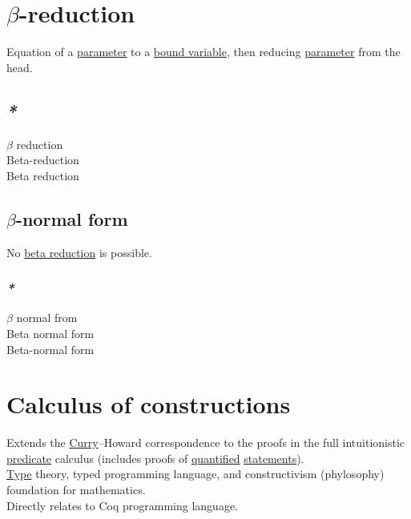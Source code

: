 \documentclass[a4paper,14pt,oneside]{book}
\begin{document}
\section{\label{org6d482ad}\(\beta\)-reduction}
\label{sec:org369f110}
Equation of a \hyperref[orgd362766]{parameter} to a \hyperref[org230eb36]{bound variable}, then reducing \hyperref[orgd362766]{parameter} from the head.\\

\subsection{\emph{*}}
\label{sec:orgc40643f}

\label{org1c571d6}\(\beta\) reduction\\
\label{org7a5a6e0}Beta-reduction\\
\label{org3043566}Beta reduction\\

\subsection{\label{org4f87f1e}\(\beta\)-normal form}
\label{sec:org98c0a7f}
No \hyperref[org3043566]{beta reduction} is possible.\\

\subsubsection{\emph{*}}
\label{sec:org215bb0d}

\label{org75d11a5}\(\beta\) normal from\\
\label{org8772320}Beta normal form\\
\label{orgc21b408}Beta-normal form\\

\section{\label{orgb0aaf3f}Calculus of constructions}
\label{sec:orgaec9a43}
Extends the \hyperref[orgea93031]{Curry}–Howard correspondence to the proofs in the full intuitionistic \hyperref[orgff4f831]{predicate} calculus (includes proofs of \hyperref[org1c9a919]{quantified} \hyperref[orga943f4a]{statements}).\\
\hyperref[org35b9249]{Type} theory, typed programming language, and constructivism (phylosophy) foundation for mathematics.\\
Directly relates to Coq programming language.\\
\end{document}
